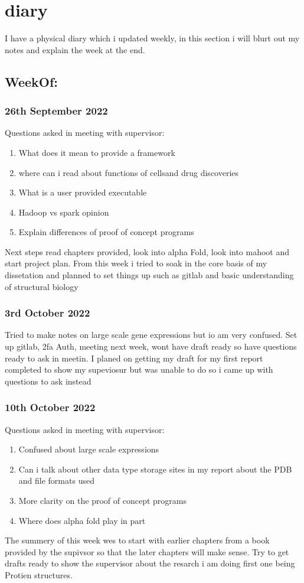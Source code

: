 \documentclass{report}
\begin{document}
\section{diary}
I have a physical diary which i updated weekly, in this section i will blurt out my notes and explain the week at the end.
\subsection*{WeekOf:}

\subsubsection{26th September 2022}
Questions asked in meeting with supervisor: 
\begin{enumerate}
    \item What does it mean to provide a framework
    \item where can i read about functions of cellsand drug discoveries
    \item What is a user provided executable
    \item Hadoop vs spark opinion
    \item Explain differences of proof of concept programs
\end{enumerate}
Next steps read chapters provided, look into alpha Fold, look into mahoot and start project plan.
From this week i tried to soak in the core basis of my dissetation and planned to set things up such as gitlab and basic understanding of structural biology

\subsubsection{3rd October 2022}
Tried to make notes on large scale gene expressions but io am very confused. Set up gitlab, 2fa Auth, meeting next week, wont have draft ready so have questions ready to ask in meetin.
I planed on getting my draft for my first report completed to show my supeviosur but was unable to do so i came up with questions to ask instead

\subsubsection{10th October 2022}
Questions asked in meeting with supervisor: 
\begin{enumerate}
    \item Confused about large scale expressions
    \item Can i talk about other data type storage sites in my report about the PDB and file formats used
    \item More clarity on the proof of concept programs
    \item Where does alpha fold play in part
\end{enumerate}
The summery of this week wes to start with earlier chapters from a book provided by the supivsor so that the later chapters will make sense. Try to get drafts ready to show the supervisor about the resarch i am doing first one being Protien structures.
\end{document}
